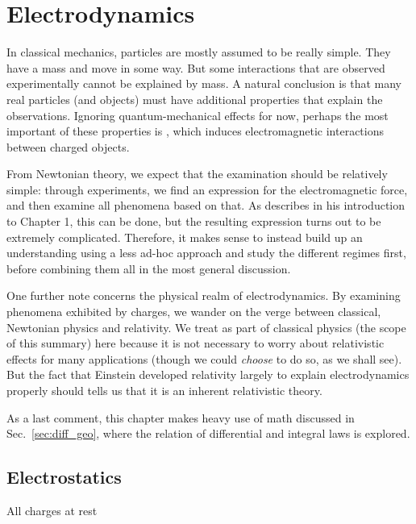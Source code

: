 \documentclass[../class_mech_main.tex]{subfiles}
\begin{document}
\chapter{Electrodynamics}




In classical mechanics, particles are mostly assumed to be really simple. They have a mass and move in some way. But some interactions that are observed experimentally cannot be explained by mass. A natural conclusion is that many real particles (and objects) must have additional properties that explain the observations. Ignoring quantum-mechanical effects for now, perhaps the most important of these properties is , which induces electromagnetic interactions between charged objects.

From Newtonian theory, we expect that the examination should be relatively simple: through experiments, we find an expression for the electromagnetic force, and then examine all phenomena based on that. As \cite{Griffiths_2017} describes in his introduction to Chapter 1, this can be done, but the resulting expression turns out to be extremely complicated. Therefore, it makes sense to instead build up an understanding using a less ad-hoc approach and study the different regimes first, before combining them all in the most general discussion.


One further note concerns the physical realm of electrodynamics. By examining phenomena exhibited by charges, we wander on the verge between classical, Newtonian physics and relativity. We treat as part of classical physics (the scope of this summary) here because it is not necessary to worry about relativistic effects for many applications (though we could \emph{choose} to do so, as we shall see). But the fact that Einstein developed relativity largely to explain electrodynamics properly should tells us that it is an inherent relativistic theory.


As a last comment, this chapter makes heavy use of math discussed in Sec.~\ref{sec:diff_geo}, where the relation of differential and integral laws is explored.



    \section{Electrostatics}
All charges at rest
\end{document}
